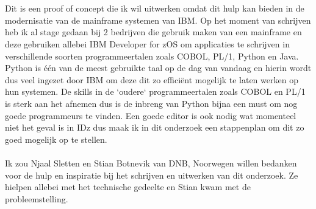 
\chapter*{}%
\label{ch:voorwoord}


Dit is een proof of concept die ik wil uitwerken omdat dit hulp kan bieden in de modernisatie van de mainframe systemen van IBM. Op het moment van schrijven heb ik al stage gedaan bij 2 bedrijven die gebruik maken van een mainframe en deze gebruiken allebei IBM Developer for zOS om applicaties te schrijven in verschillende soorten programmeertalen zoals COBOL, PL/1, Python en Java. Python is één van de meest gebruikte taal op de dag van vandaag en hierin wordt dus veel ingezet door IBM om deze dit zo efficiënt mogelijk te laten werken op hun systemen. De skills in de `oudere` programmeertalen zoals COBOL en PL/1 is sterk aan het afnemen dus is de inbreng van Python bijna een must om nog goede programmeurs te vinden. Een goede editor is ook nodig wat momenteel niet het geval is in IDz dus maak ik in dit onderzoek een stappenplan om dit zo goed mogelijk op te stellen.
\\ \\
Ik zou Njaal Sletten en Stian Botnevik van DNB, Noorwegen willen bedanken voor de hulp en inspiratie bij het schrijven en uitwerken van dit onderzoek. Ze hielpen allebei met het technische gedeelte en Stian kwam met de probleemstelling.